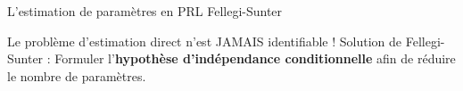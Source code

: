 \begin{frame}{\vskip -0.3cm \large L'estimation de param\`etres en PRL Fellegi-Sunter}
\pause

\scriptsize
\begin{center}
\vskip 0.1cm
Le probl\`eme d'estimation direct n'est JAMAIS identifiable ! 
\pause
Solution de Fellegi-Sunter :
\pause
\vskip 0.05cm
\normalsize
Formuler l'\textbf{\color{red}hypoth\`ese d'ind\'ependance conditionnelle}
\vskip -0.05cm
afin de r\'eduire le nombre de param\`etres.
\end{center}

\end{frame}
\normalsize

